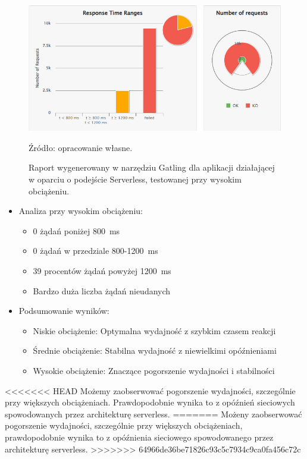 \documentclass[runningheads,12pt]{llncs}
\begin{document}
\newpage

\begin{figure}
    \includegraphics[width=\linewidth]{images/serverless-gatling-high-graph.jpg}
    \caption{Raport wygenerowany w narzędziu Gatling dla aplikacji działającej w oparciu o podejście Serverless, testowanej przy wysokim obciążeniu.} \label{fig3}
    \vspace{0.5em}
    {\small Źródło: opracowanie własne.}
\end{figure}

\begin{itemize}
  \item Analiza przy wysokim obciążeniu:
  \begin{itemize}
    \item 0 żądań poniżej 800~ms
    \item 0 żądań w przedziale 800-1200~ms
    \item 39 procentów żądań powyżej 1200~ms
    \item Bardzo duża liczba żądań nieudanych
  \end{itemize}
\end{itemize}

\begin{itemize}
  \item Podsumowanie wyników:
  \begin{itemize}
    \item Niskie obciążenie: Optymalna wydajność z szybkim czasem reakcji
    \item Średnie obciążenie: Stabilna wydajność z niewielkimi opóźnieniami
    \item Wysokie obciążenie: Znaczące pogorszenie wydajności i stabilności
  \end{itemize}
\end{itemize}

<<<<<<< HEAD
Możemy zaobserwować pogorszenie wydajności, szczególnie przy większych obciążeniach. Prawdopodobnie wynika to z opóźnień sieciowych spowodowanych przez architekturę serverless.
=======
Możeny zaobserwować pogorszenie wydajności, szczególnie przy większych obciążeniach, prawdopodobnie wynika to z opóźnienia sieciowego spowodowanego przez architekturę serverless.
>>>>>>> 64966de36be71826c93c5c7934c9ca0fa456c72c
\end{document}
